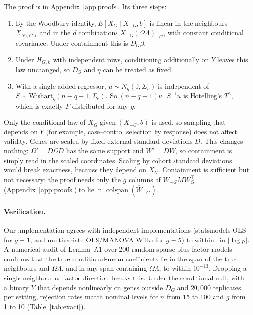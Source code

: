 \documentclass[10pt,twocolumn,letterpaper]{article}
\theoremstyle{remark}
\begin{document}
The proof is in Appendix~\ref{app:proofs}. Its three steps:
\begin{enumerate}
  \item By the Woodbury identity, $E[X_G\mid X_{-G},b]$ is linear in the neighbours $X_{N(G)}$ and in the $d$ combinations $X_{-G}(\Omega\Lambda)_{-G}$, with constant conditional covariance. Under containment this is $D_G\beta$.
  \item Under $H_{G,k}$ with independent rows, conditioning additionally on $Y$ leaves this law unchanged, so $D_G$ and $\eta$ can be treated as fixed.
  \item With a single added regressor, $u\sim N_g(0,\Sigma_c)$ is independent of $S\sim\mathrm{Wishart}_g(n-q-1,\Sigma_c)$. So $(n-q-1)u^\top S^{-1}u$ is Hotelling's $T^2$, which is exactly $F$-distributed for any $g$.
\end{enumerate}
Only the conditional law of $X_G$ given $(X_{-G},b)$ is used, so sampling that depends on $Y$ (for example, case--control selection by response) does not affect validity. Genes are scaled by fixed external standard deviations $D$. This changes nothing: $\Omega'=D\Omega D$ has the same support and $W'=DW$, so containment is simply read in the scaled coordinates. Scaling by cohort standard deviations would break exactness, because they depend on $X_G$. Containment is sufficient but not necessary: the proof needs only the $g$ columns of $W_{-G}MW_G^\top$ (Appendix~\ref{app:proofs}) to lie in $\operatorname{colspan}(\hat W_{-G})$.

\paragraph{Verification.} Our implementation agrees with independent implementations (statsmodels OLS for $g=1$, and multivariate OLS/MANOVA Wilks for $g=5$) to within \agreeMax\ in $|\log p|$. A numerical audit of Lemma~A1 over 200 random sparse-plus-factor models confirms that the true conditional-mean coefficients lie in the span of the true neighbours and $\Omega\Lambda$, and in any span containing $\Omega\Lambda$, to within $10^{-13}$. Dropping a single neighbour or factor direction breaks this. Under the conditional null, with a binary $Y$ that depends nonlinearly on genes outside $D_G$ and $20{,}000$ replicates per setting, rejection rates match nominal levels for $n$ from 15 to 100 and $g$ from 1 to 10 (Table~\ref{tab:exact}).

\begin{table}[t]
\centering\footnotesize
\caption{Exactness under the conditional null: 20{,}000 replicates per row, 95\% Monte Carlo intervals.}
\label{tab:exact}

\end{table}
\end{document}
